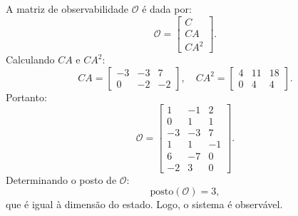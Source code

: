 \begin{resolution}
  A matriz de observabilidade \( \mathcal{O} \) é dada por:
  \[
    \mathcal{O} =
    \begin{bmatrix}
      C \\ CA \\ CA^2
    \end{bmatrix}.
  \]
  Calculando \( CA \) e \( CA^2 \):
  \[
    CA =
    \begin{bmatrix}
      -3 & -3 & 7  \\
      0  & -2 & -2
    \end{bmatrix}, \quad
    CA^2 =
    \begin{bmatrix}
      4 & 11 & 18 \\
      0 & 4  & 4
    \end{bmatrix}.
  \]
  Portanto:
  \[
    \mathcal{O} =
    \begin{bmatrix}
      1  & -1 & 2  \\
      0  & 1  & 1  \\
      -3 & -3 & 7  \\
      1  & 1  & -1 \\
      6  & -7 & 0  \\
      -2 & 3  & 0
    \end{bmatrix}.
  \]
  Determinando o posto de \( \mathcal{O} \):
  \[
    \text{posto}(\mathcal{O}) = 3,
  \]
  que é igual à dimensão do estado. Logo, o sistema é observável.
  
\end{resolution}


